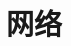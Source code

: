 \documentclass[../../interview-questions.tex]{subfiles}
\begin{document}
\section{网络}


\end{document}
